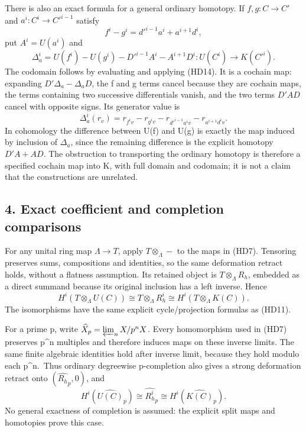 \documentclass[
]{article}
\begin{document}
There is also an exact formula for a general ordinary homotopy. If
\(f,g:C\to C'\) and \(a^i:C^i\to C'^{i-1}\) satisfy \[
f^i-g^i=d'^{i-1}a^i+a^{i+1}d^i,
\tag{HD14}
\] put \(A^i=U(a^i)\) and \[
\Delta_a^i=U(f^i)-U(g^i)-D'^{i-1}A^i-A^{i+1}D^i:
U(C^i)\longrightarrow K(C'^i).
\tag{HD15}
\] The codomain follows by evaluating and applying (HD14). It is a
cochain map: expanding \(D'\Delta_a-\Delta_aD\), the f and g terms
cancel because they are cochain maps, the terms containing two
successive differentials vanish, and the two terms \(D'AD\) cancel with
opposite signs. Its generator value is \[
\Delta_a^i(r_v)=r_{f^iv}-r_{g^iv}
-r_{d'^{i-1}a^iv}-r_{a^{i+1}d^iv}.
\tag{HD16}
\] In cohomology the difference between U(f) and U(g) is exactly the map
induced by inclusion of \(\Delta_a\), since the remaining difference is
the explicit homotopy \(D'A+AD\). The obstruction to transporting the
ordinary homotopy is therefore a specified cochain map into K, with full
domain and codomain; it is not a claim that the constructions are
unrelated.

\subsection{4. Exact coefficient and completion
comparisons}\label{exact-coefficient-and-completion-comparisons}

For any unital ring map \(\Lambda\to T\), apply \(T\otimes_\Lambda-\) to
the maps in (HD7). Tensoring preserves sums, compositions and
identities, so the same deformation retract holds, without a flatness
assumption. Its retained object is \(T\otimes_\Lambda R_h\), embedded as
a direct summand because its original inclusion has a left inverse.
Hence \[
H^i(T\otimes_\Lambda U(C))
\cong T\otimes_\Lambda R_h^i
\cong H^i(T\otimes_\Lambda K(C)).
\tag{HD17}
\] The isomorphisms have the same explicit cycle/projection formulas as
(HD11).

For a prime p, write \(\widehat X_p=\varprojlim_nX/p^nX\). Every
homomorphism used in (HD7) preserves p\^{}n multiples and therefore
induces maps on these inverse limits. The same finite algebraic
identities hold after inverse limit, because they hold modulo each
p\^{}n.~Thus ordinary degreewise p-completion also gives a strong
deformation retract onto \((\widehat{R_h}_p,0)\), and \[
H^i(\widehat{U(C)}_p)\cong\widehat{R_h^i}_p
\cong H^i(\widehat{K(C)}_p).
\tag{HD18}
\] No general exactness of completion is assumed: the explicit split
maps and homotopies prove this case.
\end{document}
